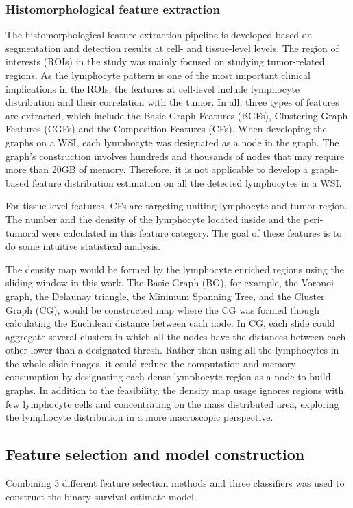 \documentclass[num-refs]{wiley-article}
\begin{document}
\subsubsection{Histomorphological feature extraction}
The histomorphological feature extraction pipeline is developed based on segmentation and detection results at cell- and tissue-level levels. The region of interests (ROIs) in the study was mainly focused on studying tumor-related regions. As the lymphocyte pattern is one of the most important clinical implications in the ROIs, the features at cell-level include lymphocyte distribution and their correlation with the tumor. In all, three types of features are extracted, which include the Basic Graph Features (BGFs), Clustering Graph Features (CGFs) and the Composition Features (CFs). When developing the graphs on a WSI, each lymphocyte was designated as a node in the graph. The graph's construction involves hundreds and thousands of nodes that may require more than 20GB of memory. Therefore, it is not applicable to develop a graph-based feature distribution estimation on all the detected lymphocytes in a WSI.

For tissue-level features, CFs are targeting uniting lymphocyte and tumor region. The number and the density of the lymphocyte located inside and the peri-tumoral were calculated in this feature category. The goal of these features is to do some intuitive statistical analysis.

The density map would be formed by the lymphocyte enriched regions using the sliding window in this work. The Basic Graph (BG), for example, the Voronoi graph, the Delaunay triangle, the Minimum Spanning Tree, and the Cluster Graph (CG), would be constructed map where the CG was formed though calculating the Euclidean distance between each node. In CG, each slide could aggregate several clusters in which all the nodes have the distances between each other lower than a designated thresh. Rather than using all the lymphocytes in the whole slide images, it could reduce the computation and memory consumption by designating each dense lymphocyte region as a node to build graphs. In addition to the feasibility, the density map usage ignores regions with few lymphocyte cells and concentrating on the mass distributed area, exploring the lymphocyte distribution in a more macroscopic perspective. 

\subsection{Feature selection and model construction}
Combining 3 different feature selection methods and three classifiers was used to construct the binary survival estimate model. 
\end{document}
